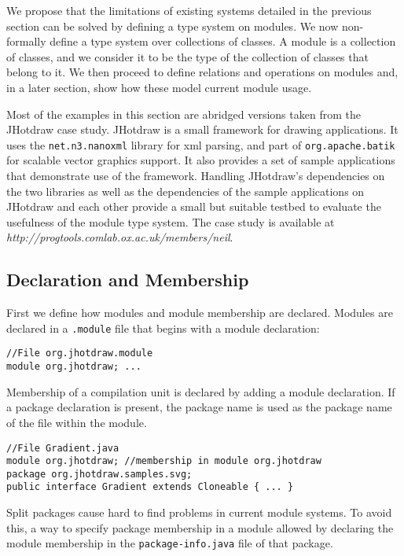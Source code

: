 
We propose that the limitations of existing systems detailed in the previous section
can be solved by defining a type system on modules. 
We now non-formally define a type system over collections of classes. 
A module is a collection of classes, and we consider it to be the type of 
the collection of classes that belong to it. We then proceed to define
relations and operations on modules and, in a later section, show how
these model current module usage. 

Most of the examples in this section are abridged versions taken from the JHotdraw case study. 
JHotdraw\cite{jhotdraw} is a small framework for drawing applications. It
uses the \texttt{net.n3.nanoxml} library for xml parsing, and part of 
\texttt{org.apache.batik} for scalable vector graphics support. It also
provides a set of sample applications that demonstrate use of the framework.
Handling JHotdraw's dependencies on the two libraries as well as the dependencies
of the sample applications on JHotdraw and each other provide a small but
suitable testbed to evaluate the usefulness of the module type system.
The case study is available at \textit{http://progtools.comlab.ox.ac.uk/members/neil}. 

\subsection{Declaration and Membership}

First we define how modules and module membership are declared. 
Modules are declared in a {\tt .module} file that begins with a module
declaration:

\begin{lstlisting}
//File org.jhotdraw.module
module org.jhotdraw; ...
\end{lstlisting}

Membership of a compilation unit is 
declared by adding a module declaration. If a package declaration is present, 
the package name is used as the package name of the file within the module.

\begin{lstlisting}
//File Gradient.java
module org.jhotdraw; //membership in module org.jhotdraw
package org.jhotdraw.samples.svg;
public interface Gradient extends Cloneable { ... }
\end{lstlisting}

Split packages cause hard to find problems in current module systems\cite{iJAMComments}. To avoid this, 
a way to specify package membership in a module allowed by declaring the module membership
in the {\tt package-info.java} file of that package.

